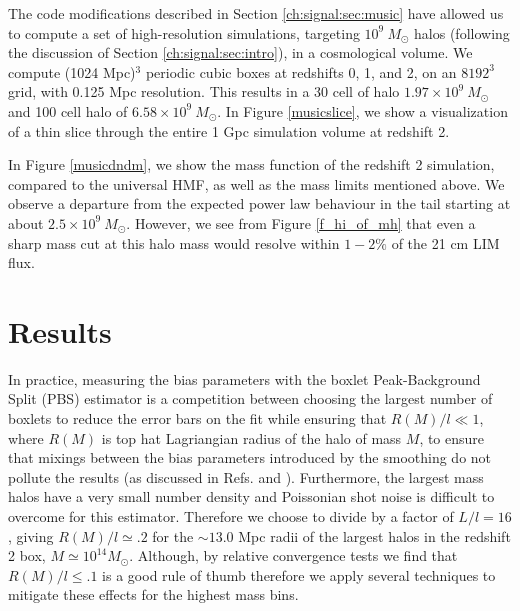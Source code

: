 The code modifications described in Section \ref{ch:signal:sec:music} have allowed us to compute a set of high-resolution simulations, targeting $10^9~M_\odot$ halos (following the discussion of Section \ref{ch:signal:sec:intro}), in a cosmological volume. We compute (1024 Mpc)$^3$ periodic cubic boxes at redshifts 0, 1, and 2, on an $8192^3$ grid, with 0.125 Mpc resolution. This results in a 30 cell of halo $1.97 \times 10^{9}~M_\odot$ and 100 cell halo of $6.58 \times 10^{9}~M_\odot$. In Figure \ref{musicslice}, we show a visualization of a thin slice through the entire 1 Gpc simulation volume at redshift 2. 

In Figure \ref{musicdndm}, we show the mass function of the redshift 2 simulation, compared to the \citeauthor{tinker2008} universal HMF, as well as the mass limits mentioned above. We observe a departure from the expected power law behaviour in the tail starting at about $2.5 \times 10^{9}~M_\odot$. However, we see from Figure \ref{f_hi_of_mh} that even a sharp mass cut at this halo mass would resolve within $1-2 \%$ of the 21 cm LIM flux.

\section{Results}
\label{ch:signal:sec:results}

In practice, measuring the bias parameters with the boxlet Peak-Background Split (PBS) estimator is a competition between choosing the largest number of boxlets to reduce the error bars on the fit while ensuring that $R(M)/l \ll 1$, where $R(M)$ is top hat Lagriangian radius of the halo of mass $M$, to ensure that mixings between the bias parameters introduced by the smoothing do not pollute the results (as discussed in Refs. \citep{biasreview} and \citep{modietal2017}). Furthermore, the largest mass halos  have a very small number density and Poissonian shot noise is difficult to overcome for this estimator. Therefore we choose to divide by a factor of $L/l = 16$, giving $R(M)/l \simeq .2$ for the $\sim 13.0$ Mpc radii of the largest halos in the redshift 2 box, $M \simeq 10^{14} M_\odot$. Although, by relative convergence tests we find that $R(M)/l \leq .1$ is a good rule of thumb therefore we apply several techniques to mitigate these effects for the highest mass bins.

